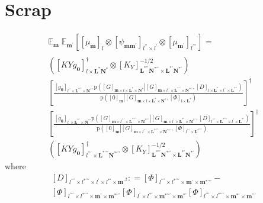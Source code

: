 \documentclass[preprint,12pt]{elsarticle}
\newcommand*{\M}[1]{\ensuremath{#1}\xspace}
\newcommand*{\x}{\times}
\newcommand*{\mi}[1]{\mathbf{#1}}
\newcommand*{\te}[2][]{\left\lbrack{#2}\right\rbrack_{#1}}
\newcommand*{\prob}[3]{\M{\mathrm{p}\!\left(\left.{#1}\right\vert{#2,#3}\right)}}
\newcommand*{\deq}{\M{\mathrel{\mathop:}=}}
\newcommand*{\evt}[3][]{\mathbb{E}_{#3}^{#1}\!#2}
\begin{document}
\section{Scrap}
        \begin{multline*}
            \evt{\;\evt{\te[]{\te[l]{\mu_{\mi{m}}} \otimes \te[l^{\prime\prime}\x l^{\prime}]{\psi_{\mi{mm^{\prime}}}} \otimes \te[l^{\prime\prime\prime}]{\mu_{\mi{m^{\prime}}}}}}{\mi{m^{\prime}}}}{\mi{m}} = \\
            \left(\te[l\x\mi{L^{*}N^{*}}]{KY\!g_{\mi{0}}}^{\dagger} \otimes
            \te[\mi{L^{*\prime\prime}N^{*\prime\prime}}\x\mi{L^{*\prime}N^{*\prime}}]{K_{Y}}^{-1/2}\right) \\
            \left\lbrack\frac{
            \te[l^{\prime\prime}\x\mi{L^{*\prime\prime}}\x\mi{N^{*\prime\prime}}]{g_{\mi{0}}}
            \prob{\te[\mi{m}\x l\x \mi{L^{*}\x N^{*}}]{G}}
            {\te[\mi{m}\x l^{\prime\prime}\x \mi{L^{*\prime\prime}\x N^{*\prime\prime}}]{G}}{\te[l\x\mi{L^{*}}\x l^{\prime\prime}\x\mi{L^{*\prime\prime}}]{D}}}
            {\prob{\te[\mi{m}]{0}}{\te[\mi{m}\x l\x \mi{L^{*}\x N^{*}}]{G}}{\te[l\x \mi{L^{*}}]{\Phi}}} \right\rbrack^{\dagger} \\
            \left\lbrack\frac{
            \te[l^{\prime}\x\mi{L^{*\prime}}\x\mi{N^{*\prime}}]{g_{\mi{0}}}
            \prob{\te[\mi{m}\x l^{\prime\prime\prime}\x \mi{L^{*\prime\prime\prime}\x N^{*\prime\prime\prime}}]{G}}
            {\te[\mi{m}\x l^{\prime}\x \mi{L^{*\prime}\x N^{*\prime}}]{G}}{\te[l^{\prime\prime\prime}\x\mi{L^{*\prime\prime\prime}}\x l^{\prime}\x\mi{L^{*\prime}}]{D}}}
            {\prob{\te[\mi{m}]{0}}{\te[\mi{m}\x l^{\prime\prime\prime}\x \mi{L^{*\prime\prime\prime}\x N^{*\prime\prime\prime}}]{G}}{\te[l^{\prime\prime\prime}\x \mi{L^{*\prime\prime\prime}}]{\Phi}}} \right\rbrack^{\dagger} \\
            \left(\te[l^{\prime\prime\prime}\x\mi{L^{*\prime\prime\prime}N^{*\prime\prime\prime}}]{KY\!g_{\mi{0}}}^{\dagger} \otimes
            \te[\mi{L^{*\prime\prime}N^{*\prime\prime}}\x\mi{L^{*\prime}N^{*\prime}}]{K_{Y}}^{-1/2}\right)
            \qquad\qquad\qquad\quad
        \end{multline*}
        where
        \begin{multline*}
            \te[l^{\prime\prime\prime} \x l^{*\prime\prime\prime}\x l^{\prime}\x l^{*\prime}\x\mi{m^{\prime}}^{2}]{D} \deq \te[l^{\prime\prime\prime}\x l^{*\prime\prime\prime}\x\mi{m^{\prime}}\x\mi{m^{*\prime\prime\prime}}]{\Phi} -  \\ 
            \te[l^{\prime\prime\prime}\x l^{*\prime\prime\prime}\x\mi{m^{\prime}}\x\mi{m^{*\prime\prime\prime}}]{\Phi}
            \te[l^{\prime}\x l^{*\prime}\x\mi{m^{*\prime\prime\prime}}\x\mi{m^{*\prime}}]{\Phi}
            \te[l^{\prime\prime\prime}\x l^{*\prime\prime\prime}\x\mi{m^{*\prime}}\x\mi{m^{\prime\prime\prime}}]{\Phi}
        \end{multline*}
\end{document}
